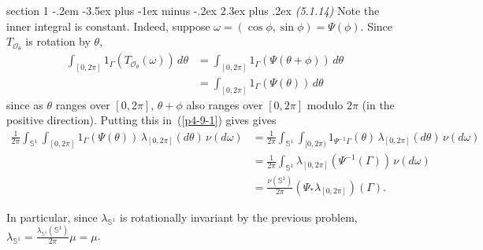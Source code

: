 \documentclass[12pt]{article}
\makeatletter
\theoremstyle{norm}
\newcommand{\bS}[0]{\mathbb{S}}
\newcommand{\sO}[0]{\mathcal{O}}
\newcommand{\rc}[1]{\frac{1}{#1}}
\newcommand{\Ga}[0]{\Gamma}
\newcommand{\la}[0]{\lambda}
\newcommand{\te}[0]{\theta}
\newcommand{\om}[0]{\omega}
\newenvironment{problem}{\@startsection
       {section}
       {1}
       {-.2em}
       {-3.5ex plus -1ex minus -.2ex}
       {2.3ex plus .2ex}
       {\pagebreak[3]%
       \large\bf\noindent{Problem }
       }
       }
       {%
       }
\makeatother
\begin{document}
\begin{problem}{\it (5.1.14)}
Note the inner integral is constant. Indeed, suppose $\om=(\cos\phi,\sin\phi)=\Psi(\phi)$. Since $T_{\sO_{\te}}$ is rotation by $\te$,
\begin{align*}
\int_{[0,2\pi]} 1_{\Ga} (T_{\sO_{\te}}(\om))\,d\te
&=\int_{[0,2\pi]} 1_{\Ga}(\Psi(\te+\phi))\,d\te\\
&=\int_{[0,2\pi]} 1_{\Ga}(\Psi(\te))\,d\te
\end{align*}
since as $\te$ ranges over $[0,2\pi]$, $\te+\phi$ also ranges over $[0,2\pi]$ modulo $2\pi$ (in the positive direction). Putting this in~(\ref{p4-9-1}) gives gives
\begin{align*}
\rc{2\pi}\int_{\bS^1}\int_{[0,2\pi]} 1_{\Ga}(\Psi(\te))\,\la_{[0,2\pi]}(d\te)\,\nu(d\om)
&=\rc{2\pi}\int_{\bS^1}\int_{[0,2\pi)} %
1_{\Psi^{-1}\Ga}(\te) \,\la_{[0,2\pi]}(d\te)\,\nu(d\om)\\
&=\rc{2\pi}\int_{\bS^1} \la_{[0,2\pi]}(\Psi^{-1}(\Ga))\,\nu(d\om)\\
&=\frac{\nu(\bS^1)}{2\pi} (\Psi_*\la_{[0,2\pi]})(\Ga).
\end{align*}

In particular, since $\la_{\bS^1}$ is rotationally invariant by the previous problem, $\la_{\bS^1}=\frac{\la_{\bS^1}(\bS^1)}{2\pi}\mu=\mu$.


\end{problem}
\end{document}
